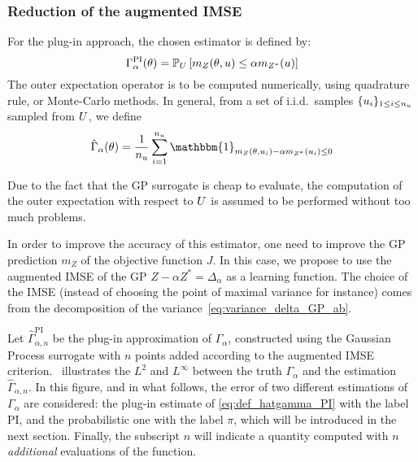 \documentclass[../../Main_ManuscritThese.tex]{subfiles}
\begin{document}
\subsubsection{Reduction of the augmented IMSE}
For the plug-in approach, the chosen estimator is defined by:
\begin{equation}
  \label{eq:def_gamma_PI}
  \Gamma_{\alpha}^{\mathrm{PI}}(\theta) = \mathbb{P}_U\left[m_Z(\theta,u) \leq \alpha m_{{Z^*}}(u) \right]
\end{equation}
The outer expectation operator is to be computed numerically, using
quadrature rule, or Monte-Carlo methods. In general, from a set of
i.i.d.\ samples $\{u_i\}_{1\leq i \leq n_{u}}$ sampled from $U$,
we define
\begin{equation}
    \label{eq:def_hatgamma_PI}
  \hat{\Gamma}_{\alpha}(\kk) = \frac{1}{n_{\uu}}\sum_{i=1}^{n_{\uu}} \mathbbm{1}_{m_Z(\kk, \uu_i) - \alpha m_{Z^*}(\uu_i)\leq 0}
\end{equation}

Due to the fact that the GP surrogate is cheap to evaluate, the
computation of the outer expectation with respect to $U$ is
assumed to be performed without too much problems.

In order to improve the accuracy of this estimator, one need to
improve the GP prediction $m_Z$ of the objective function $J$.
In this case, we propose to use the augmented IMSE of the GP
$Z - \alpha Z^* = \Delta_{\alpha}$ %
as a learning function. The choice of the IMSE
(instead of choosing the point of maximal variance for instance) comes
from the decomposition of the variance~\cref{eq:variance_delta_GP_ab}.


Let $\hat{\Gamma}^{\mathrm{PI}}_{\alpha,n}$ be the plug-in
approximation of $\Gamma_\alpha$, constructed using the Gaussian
Process surrogate with $n$ points added according to the augmented
IMSE criterion.~ illustrates the $L^2$ and
$L^{\infty}$ between the truth $\Gamma_\alpha$ and the estimation
$\hat{\Gamma}_{\alpha,n}$. In this figure, and in what follows, the
error of two different estimations of $\Gamma_{\alpha}$ are
considered: the plug-in estimate of \cref{eq:def_hatgamma_PI} with the
label $\mathrm{PI}$, and the probabilistic one with the label $\pi$,
which will be introduced in the next section.  Finally, the subscript
$n$ will indicate a quantity computed with $n$ \emph{additional}
evaluations of the function.
\end{document}
